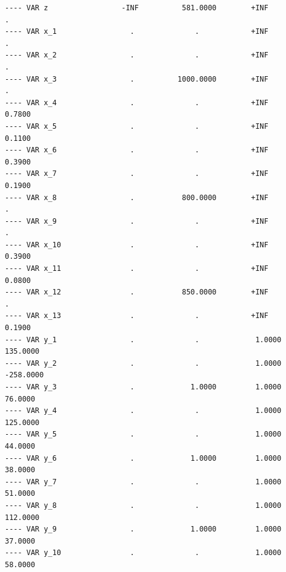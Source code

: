 \documentclass[11pt]{article}
\begin{document}
\begin{verbatim}
---- VAR z                 -INF          581.0000        +INF             .          
---- VAR x_1                 .              .            +INF             .          
---- VAR x_2                 .              .            +INF             .          
---- VAR x_3                 .          1000.0000        +INF             .          
---- VAR x_4                 .              .            +INF            0.7800      
---- VAR x_5                 .              .            +INF            0.1100      
---- VAR x_6                 .              .            +INF            0.3900      
---- VAR x_7                 .              .            +INF            0.1900      
---- VAR x_8                 .           800.0000        +INF             .          
---- VAR x_9                 .              .            +INF             .          
---- VAR x_10                .              .            +INF            0.3900      
---- VAR x_11                .              .            +INF            0.0800      
---- VAR x_12                .           850.0000        +INF             .          
---- VAR x_13                .              .            +INF            0.1900      
---- VAR y_1                 .              .             1.0000       135.0000      
---- VAR y_2                 .              .             1.0000      -258.0000      
---- VAR y_3                 .             1.0000         1.0000        76.0000      
---- VAR y_4                 .              .             1.0000       125.0000      
---- VAR y_5                 .              .             1.0000        44.0000      
---- VAR y_6                 .             1.0000         1.0000        38.0000      
---- VAR y_7                 .              .             1.0000        51.0000      
---- VAR y_8                 .              .             1.0000       112.0000      
---- VAR y_9                 .             1.0000         1.0000        37.0000      
---- VAR y_10                .              .             1.0000        58.0000      


\end{verbatim}
\end{document}
